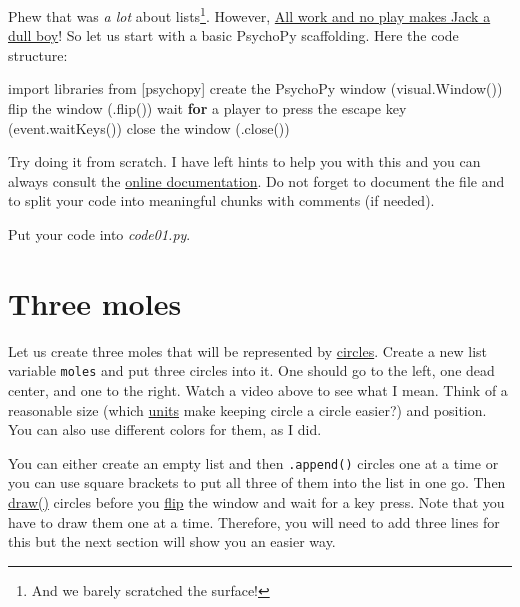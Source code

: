 \documentclass[
]{book}
\newenvironment{Shaded}{\begin{snugshade}}{\end{snugshade}}
\newcommand{\ControlFlowTok}[1]{\textcolor[rgb]{0.13,0.29,0.53}{\textbf{#1}}}
\newcommand{\ImportTok}[1]{#1}
\newcommand{\NormalTok}[1]{#1}
\begin{document}
Phew that was \emph{a lot} about lists\footnote{And we barely scratched the surface!}. However, \href{https://en.wikipedia.org/wiki/All_work_and_no_play_makes_Jack_a_dull_boy}{All work and no play makes Jack a dull boy}! So let us start with a basic PsychoPy scaffolding. Here the code structure:

\begin{Shaded}
\begin{Highlighting}[]
\ImportTok{import}\NormalTok{ libraries }\ImportTok{from}\NormalTok{ [psychopy]}
\NormalTok{create the PsychoPy window (visual.Window())}
\NormalTok{flip the window (.flip())}
\NormalTok{wait }\ControlFlowTok{for}\NormalTok{ a player to press the escape key (event.waitKeys())}
\NormalTok{close the window (.close())}
\end{Highlighting}
\end{Shaded}

Try doing it from scratch. I have left hints to help you with this and you can always consult the \href{https://psychopy.org/api/index.html}{online documentation}. Do not forget to document the file and to split your code into meaningful chunks with comments (if needed).

Put your code into \emph{code01.py}.

\hypertarget{three-moles}{%
\section{Three moles}\label{three-moles}}

Let us create three moles that will be represented by \href{https://psychopy.org/api/visual/circle.html\#psychopy.visual.circle.Circle}{circles}. Create a new list variable \texttt{moles} and put three circles into it. One should go to the left, one dead center, and one to the right. Watch a video above to see what I mean. Think of a reasonable size (which \protect\hyperlink{psychopy-units}{units} make keeping circle a circle easier?) and position. You can also use different colors for them, as I did.

You can either create an empty list and then \texttt{.append()} circles one at a time or you can use square brackets to put all three of them into the list in one go. Then \href{https://psychopy.org/api/visual/circle.html\#psychopy.visual.circle.Circle.draw}{draw()} circles before you \href{https://psychopy.org/api/visual/window.html\#psychopy.visual.Window.flip}{flip} the window and wait for a key press. Note that you have to draw them one at a time. Therefore, you will need to add three lines for this but the next section will show you an easier way.
\end{document}
